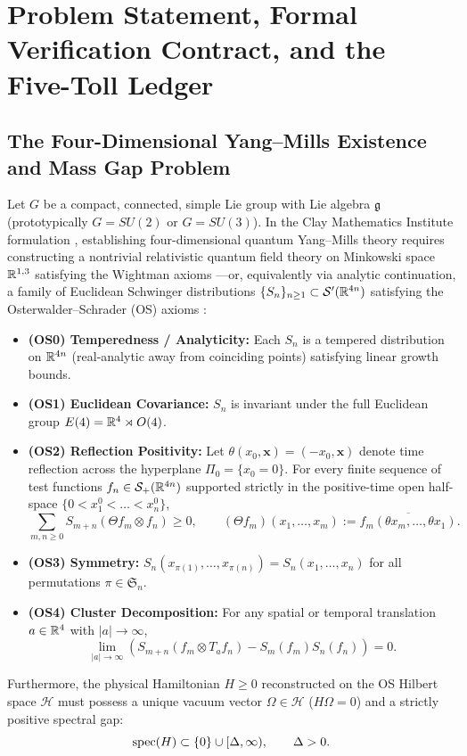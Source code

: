 \section{Problem Statement, Formal Verification Contract, and the Five-Toll Ledger}
\label{sec:ch1}

\subsection{The Four-Dimensional Yang--Mills Existence and Mass Gap Problem}
Let $G$ be a compact, connected, simple Lie group with Lie algebra $\mathfrak{g}$ (prototypically $G = SU(2)$ or $G = SU(3)$). In the Clay Mathematics Institute formulation \cite{JaffeWitten2000}, establishing four-dimensional quantum Yang--Mills theory requires constructing a nontrivial relativistic quantum field theory on Minkowski space $\mathbb{R}^{1,3}$ satisfying the Wightman axioms \cite{StreaterWightman1964}---or, equivalently via analytic continuation, a family of Euclidean Schwinger distributions $\{S_n\}_{n \ge 1} \subset \mathcal{S}'(\mathbb{R}^{4n})$ satisfying the Osterwalder--Schrader (OS) axioms \cite{OsterwalderSchrader1973,OsterwalderSchrader1975}:
\begin{itemize}
    \item \textbf{(OS0) Temperedness / Analyticity:} Each $S_n$ is a tempered distribution on $\mathbb{R}^{4n}$ (real-analytic away from coinciding points) satisfying linear growth bounds.
    \item \textbf{(OS1) Euclidean Covariance:} $S_n$ is invariant under the full Euclidean group $E(4) = \mathbb{R}^4 \rtimes O(4)$.
    \item \textbf{(OS2) Reflection Positivity:} Let $\theta(x_0, \mathbf{x}) = (-x_0, \mathbf{x})$ denote time reflection across the hyperplane $\Pi_0 = \{x_0 = 0\}$. For every finite sequence of test functions $f_n \in \mathcal{S}_+(\mathbb{R}^{4n})$ supported strictly in the positive-time open half-space $\{0 < x_1^0 < \dots < x_n^0\}$,
    \begin{equation}
    \sum_{m,n \ge 0} S_{m+n}(\Theta f_m \otimes f_n) \ge 0, \qquad (\Theta f_m)(x_1,\dots,x_m) := \overline{f_m(\theta x_m, \dots, \theta x_1)}.
    \end{equation}
    \item \textbf{(OS3) Symmetry:} $S_n(x_{\pi(1)}, \dots, x_{\pi(n)}) = S_n(x_1, \dots, x_n)$ for all permutations $\pi \in \mathfrak{S}_n$.
    \item \textbf{(OS4) Cluster Decomposition:} For any spatial or temporal translation $a \in \mathbb{R}^4$ with $|a| \to \infty$,
    \begin{equation}
    \lim_{|a| \to \infty} \left( S_{m+n}(f_m \otimes T_a f_n) - S_m(f_m) S_n(f_n) \right) = 0.
    \end{equation}
\end{itemize}
Furthermore, the physical Hamiltonian $H \ge 0$ reconstructed on the OS Hilbert space $\mathcal{H}$ must possess a unique vacuum vector $\Omega \in \mathcal{H}$ ($H\Omega = 0$) and a strictly positive spectral gap:
\begin{equation}
\operatorname{spec}(H) \subset \{0\} \cup [\Delta, \infty), \qquad \Delta > 0.
\end{equation}

